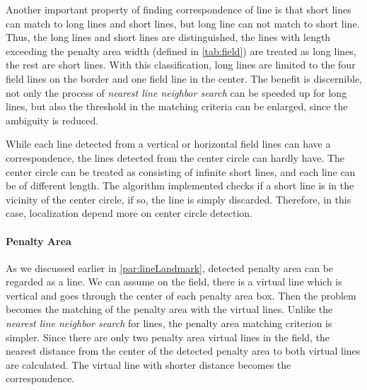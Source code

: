 Another important property of finding correspondence of line is that short lines can match to long lines and short lines, but long line can not match to short line. Thus, the long lines and short lines are distinguished, the lines with length exceeding the penalty area width (defined in \autoref{tab:field}) are treated as long lines, the rest are short lines. With this classification, long lines are limited to the four field lines on the border and one field line in the center. The benefit is discernible, not only the process of \textit{nearest line neighbor search} can be speeded up for long lines, but also the threshold in the matching criteria can be enlarged, since the ambiguity is reduced. 

While each line detected from a vertical or horizontal field lines can have a correspondence, the lines detected from the center circle can hardly have. The center circle can be treated as consisting of infinite short lines, and each line can be of different length. The algorithm implemented checks if a short line is in the vicinity of the center circle, if so, the line is simply discarded. Therefore, in this case, localization depend more on center circle detection.




\paragraph{Penalty Area}
As we discussed earlier in \autoref{par:lineLandmark}, detected penalty area can be regarded as a line. We can assume on the field, there is a virtual line which is vertical and goes through the center of each penalty area box. Then the problem becomes the matching of the penalty area with the virtual lines. Unlike the \textit{nearest line neighbor search} for lines, the penalty area matching criterion is simpler. Since there are only two penalty area virtual lines in the field, the nearest distance from the center of the detected penalty area to both virtual lines are calculated. The virtual line with shorter distance becomes the correspondence.
